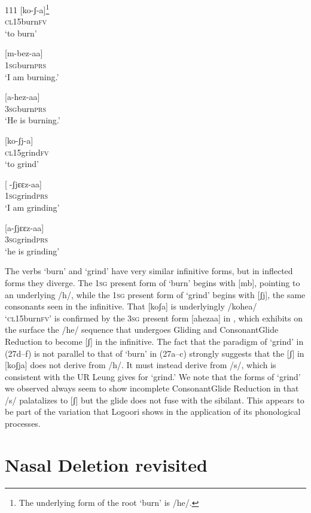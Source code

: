 \documentclass[output=paper]{langsci/langscibook}
\begin{document}
\begin{tabular}{111}
\ea\label{ex:glewwe:27}{}
  \ea\label{ex:glewwe:27a}
 [ko-ʃ{}-a]\footnote{The underlying form of the root ‘burn’ is /he/.} \\{}
\textsc{cl15}burn\textsc{fv}\\{}
\glt ‘to burn’

\ex\label{ex:glewwe:27b}{}
 [m-bez-aa]\\{}
\textsc{1sg}burn\textsc{prs}\\{}
\glt ‘I am burning.’


\ex\label{ex:glewwe:27c}{}
 [a-hez-aa]\\{}
\textsc{3sg}burn\textsc{prs}\\{}
\glt ‘He is burning.’


\ex\label{ex:glewwe:27d}{}
 [ko-ʃj-a]\\{}
\textsc{cl15}grind\textsc{fv}\\{}
\glt ‘to grind’


\ex\label{ex:glewwe:27e}{}
 [-ʃjɛɛz-aa]\\{}
\textsc{1sg}grind\textsc{prs}\\{}
\glt ‘I am grinding’


\ea{}
 [a-ʃjɛɛz-aa]\\{}
\textsc{3sg}grind\textsc{prs}\\{}
\glt ‘he is grinding’
\z

The verbs ‘burn’ and ‘grind’ have very similar infinitive forms, but in inflected forms they diverge. The 1\textsc{sg} present form of ‘burn’ begins with [mb], pointing to an underlying /h/, while the 1\textsc{sg} present form of ‘grind’ begins with [ʃj], the same consonants seen in the infinitive. That [koʃa] is underlyingly /kohea/ ‘\textsc{cl}15burn\textsc{fv’} is confirmed by the 3\textsc{sg} present form [ahezaa] in , which exhibits on the surface the /he/ sequence that undergoes Gliding and ConsonantGlide Reduction to become [ʃ] in the infinitive. The fact that the paradigm of ‘grind’ in (27d–f) is not parallel to that of ‘burn’ in (27a–c) strongly suggests that the [ʃ] in [koʃja] does not derive from /h/. It must instead derive from /s/, which is consistent with the UR Leung gives for ‘grind.’ We note that the forms of ‘grind’ we observed always seem to show incomplete ConsonantGlide Reduction in that /s/ palatalizes to [ʃ] but the glide does not fuse with the sibilant. This appears to be part of the variation that Logoori shows in the application of its phonological processes.

\section{Nasal Deletion revisited}


\end{tabular}
\end{document}
